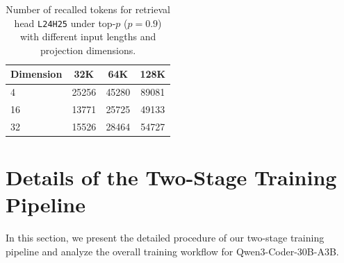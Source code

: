 \documentclass{llmxive}
\begin{document}
\begin{table}[ht]
    \centering
    \small
    \begin{tabular}{lccc}
        \toprule
        \textbf{Dimension} & \textbf{32K} & \textbf{64K} & \textbf{128K} \\
        \midrule
        4  & 25256 & 45280 & 89081 \\
        16 & 13771 & 25725 & 49133 \\
        32 & 15526 & 28464 & 54727 \\
        \bottomrule
    \end{tabular}
\caption{Number of recalled tokens for retrieval head \texttt{L24H25} under top-$p$ ($p=0.9$) with different input lengths and projection dimensions.}
\label{tab:appendix_l24h25_lowdim_topp_tokens}
\end{table}




\section{Details of the Two-Stage Training Pipeline}
\label{appd:training}

In this section, we present the detailed procedure of our two-stage training pipeline and analyze the overall training workflow for Qwen3-Coder-30B-A3B.
\end{document}
